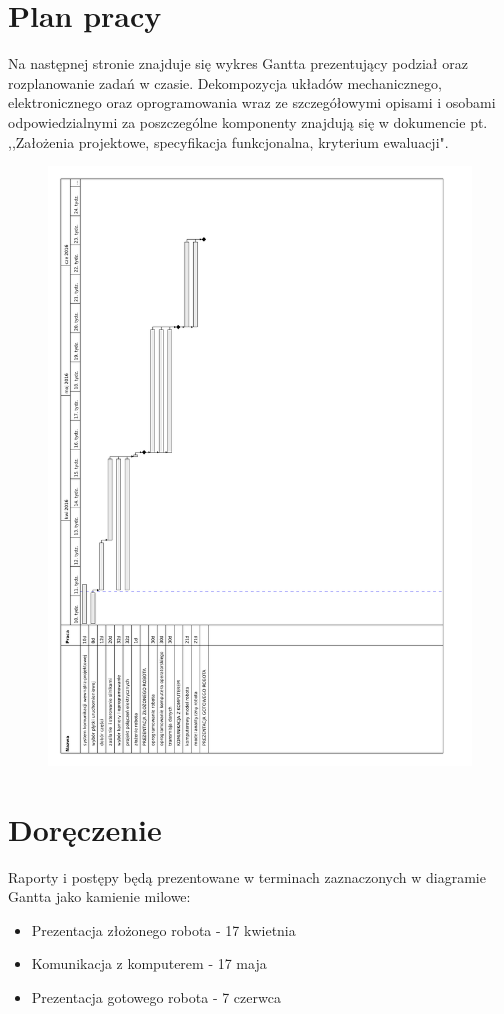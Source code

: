 \documentclass[a4paper]{article}
\begin{document}
\section{Plan pracy}
    Na następnej stronie znajduje się wykres Gantta prezentujący podział oraz rozplanowanie zadań w czasie. Dekompozycja układów mechanicznego, elektronicznego oraz oprogramowania wraz ze szczegółowymi opisami i osobami odpowiedzialnymi za poszczególne komponenty znajdują się w dokumencie pt. ,,Założenia projektowe, specyfikacja funkcjonalna, kryterium ewaluacji".    
        \begin{figure}
            \centering
            \includegraphics[scale=0.7]{autko}
            \label{fig:my_label}
        \end{figure}
        
\section{Doręczenie}
    Raporty i postępy będą prezentowane w terminach zaznaczonych w diagramie Gantta jako kamienie milowe:
    \begin{itemize}
        \item Prezentacja złożonego robota - 17 kwietnia
        \item Komunikacja z komputerem - 17 maja
        \item Prezentacja gotowego robota - 7 czerwca
    \end{itemize}
\end{document}

